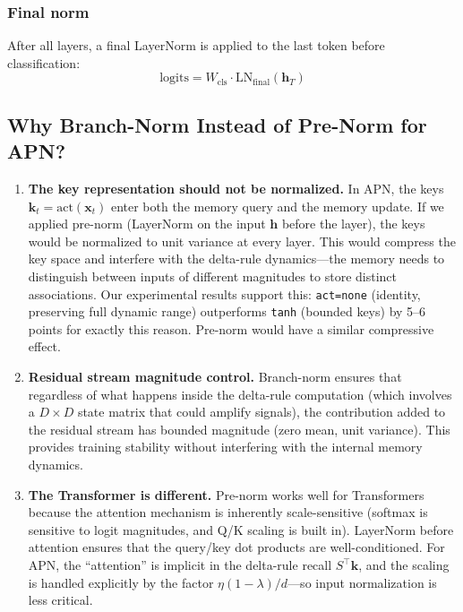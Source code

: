\documentclass[11pt,a4paper]{article}
\begin{document}
\subsubsection{Final norm}

After all layers, a final LayerNorm is applied to the last token before classification:
\begin{equation}
\text{logits} = W_{\text{cls}} \cdot \text{LN}_{\text{final}}(\mathbf{h}_{T})
\end{equation}

\subsection{Why Branch-Norm Instead of Pre-Norm for APN?}

\begin{enumerate}
\item \textbf{The key representation should not be normalized.}
In APN, the keys $\mathbf{k}_t = \text{act}(\mathbf{x}_t)$ enter both the memory query and the memory update.
If we applied pre-norm (LayerNorm on the input $\mathbf{h}$ before the layer), the keys would be normalized to unit variance at every layer.
This would compress the key space and interfere with the delta-rule dynamics---the memory needs to distinguish between inputs of different magnitudes to store distinct associations.
Our experimental results support this: \texttt{act=none} (identity, preserving full dynamic range) outperforms \texttt{tanh} (bounded keys) by 5--6 points for exactly this reason.
Pre-norm would have a similar compressive effect.

\item \textbf{Residual stream magnitude control.}
Branch-norm ensures that regardless of what happens inside the delta-rule computation (which involves a $D \times D$ state matrix that could amplify signals), the contribution added to the residual stream has bounded magnitude (zero mean, unit variance).
This provides training stability without interfering with the internal memory dynamics.

\item \textbf{The Transformer is different.}
Pre-norm works well for Transformers because the attention mechanism is inherently scale-sensitive (softmax is sensitive to logit magnitudes, and Q/K scaling is built in).
LayerNorm before attention ensures that the query/key dot products are well-conditioned.
For APN, the ``attention'' is implicit in the delta-rule recall $S^\top \mathbf{k}$, and the scaling is handled explicitly by the factor $\eta(1-\lambda)/d$---so input normalization is less critical.


\end{enumerate}
\end{document}
